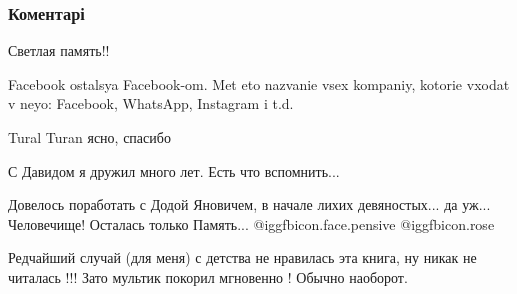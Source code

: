  
 
 
 
 
\subsubsection{Коментарі}
\label{sec:01_11_2021.fb.hakimov_aleksandr.1.david_janovich.cmt}

\begin{itemize} %

Светлая память!!


Facebook ostalsya Facebook-om. Met eto nazvanie vsex kompaniy, kotorie vxodat v
neyo: Facebook, WhatsApp, Instagram i t.d.


Tural Turan ясно, спасибо


С Давидом я дружил много лет. Есть что вспомнить...


Довелось поработать с Додой Яновичем, в начале лихих девяностых... да уж...
Человечище! Осталась только Память...  @igg{fbicon.face.pensive}
@igg{fbicon.rose} 


Редчайший случай (для меня) с детства не нравилась эта книга, ну никак не
читалась !!! Зато мультик покорил мгновенно ! Обычно наоборот.

\end{itemize} %
